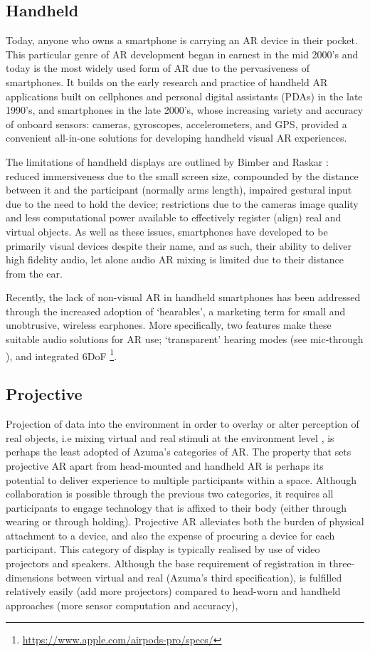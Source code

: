 \subsection{Handheld}\label{sec: ar-forms-mobile}
Today, anyone who owns a smartphone is carrying an AR device in their pocket. This particular genre of AR development began in earnest in the mid 2000's and today is the most widely used form of AR due to the pervasiveness of smartphones. It builds on the early research and practice of handheld AR applications built on cellphones and personal digital assistants (PDAs) in the late 1990's, and smartphones in the late 2000’s, whose increasing variety and accuracy of onboard sensors: cameras, gyroscopes, accelerometers, and GPS, provided a convenient all-in-one solutions for developing handheld visual AR experiences. 

The limitations of handheld displays are outlined by Bimber and Raskar \citeyearpar[pp. 79-83]{bimber2005}: reduced immersiveness due to the small screen size, compounded by the distance between it and the participant (normally arms length), impaired gestural input due to the need to hold the device; restrictions due to the cameras image quality and less computational power available to effectively register (align) real and virtual objects. As well as these issues, smartphones have developed to be primarily visual devices despite their name, and as such, their ability to deliver high fidelity audio, let alone audio AR mixing is limited due to their distance from the ear. 

Recently, the lack of non-visual AR in handheld smartphones has been addressed through the increased adoption of `hearables', a marketing term for small and unobtrusive, wireless earphones. More specifically, two features make these suitable audio solutions for AR use; `transparent' hearing modes (see mic-through \citep{lindeman2008}), and integrated 6DoF \footnote{\url{https://www.apple.com/airpods-pro/specs/}}.

\subsection{Projective}\label{sec: ar-forms-proj}
Projection of data into the environment in order to overlay or alter perception of real objects, i.e mixing virtual and real stimuli at the environment level \citep{lindeman2007}, is perhaps the least adopted of Azuma's categories of AR. The property that sets projective AR apart from head-mounted and handheld AR is perhaps its potential to deliver experience to multiple participants within a space. Although collaboration is possible through the previous two categories, it requires all participants to engage technology that is affixed to their body (either through wearing or through holding). Projective AR alleviates both the burden of physical attachment to a device, and also the expense of procuring a device for each participant. This category of display is typically realised by use of video projectors and speakers. Although the base requirement of registration in three-dimensions between virtual and real (Azuma's third specification), is fulfilled relatively easily (add more projectors) compared to head-worn and handheld approaches (more sensor computation and accuracy), 

